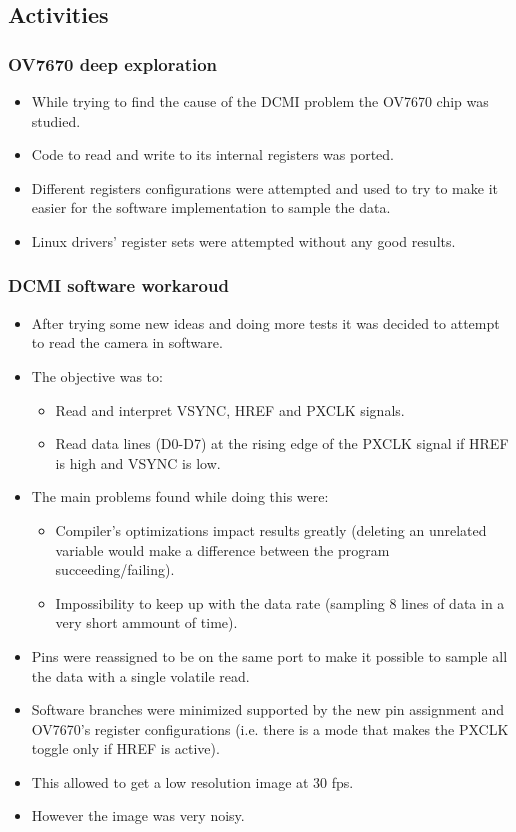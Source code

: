 \subsection{Activities}


\subsubsection{OV7670 deep exploration}
\begin{itemize}
	\item While trying to find the cause of the DCMI problem the OV7670 chip was studied.
	\item Code to read and write to its internal registers was ported.
	\item Different registers configurations were attempted and used to try to make it easier for the software implementation to sample the data.
	\item Linux drivers' register sets were attempted without any good results.
\end{itemize}



\subsubsection{DCMI software workaroud}
\begin{itemize}
	\item After trying some new ideas and doing more tests it was decided to attempt to read the camera in software.
	\item The objective was to:
	\begin{itemize}
		\item Read and interpret VSYNC, HREF and PXCLK signals.
		\item Read data lines (D0-D7) at the rising edge of the PXCLK signal if HREF is high and VSYNC is low.
	\end{itemize}
	\item The main problems found while doing this were:
	\begin{itemize}
		\item Compiler's optimizations impact results greatly (deleting an unrelated variable would make a difference between the program succeeding/failing).
		\item Impossibility to keep up with the data rate (sampling 8 lines of data in a very short ammount of time).
	\end{itemize}
	\item Pins were reassigned to be on the same port to make it possible to sample all the data with a single volatile read.
	\item Software branches were minimized supported by the new pin assignment and OV7670's register configurations (i.e. there is a mode that makes the PXCLK toggle only if HREF is active).
	\item This allowed to get a low resolution image at 30 fps.
	\item However the image was very noisy.
\end{itemize}

